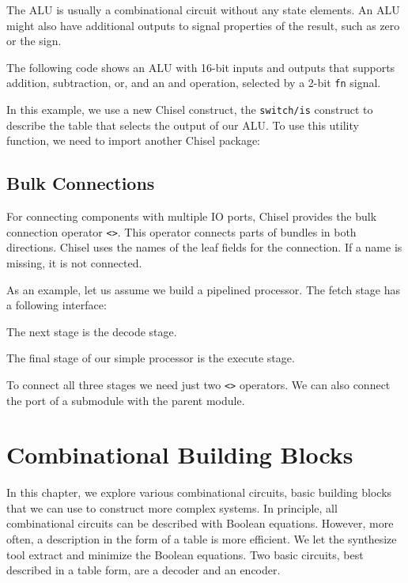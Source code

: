 \documentclass[%
    10pt,
    headinclude, footexclude,
    openright, %
    notitlepage,
    cleardoubleempty,
    headsepline,
    pointlessnumbers,
    bibtotoc, idxtotoc,
    ]{scrbook}
\newcommand{\code}[1]{{\small{\texttt{#1}}}}
\begin{document}
The ALU is usually a combinational circuit without any state elements.
An ALU might also have additional outputs to signal properties
of the result, such as zero or the sign.

The following code shows an ALU with 16-bit inputs and outputs that supports addition, subtraction, or, and an and
operation, selected by a 2-bit \code{fn} signal.


\noindent In this example, we use a new Chisel construct, the \code{switch/is} construct to describe
the table that selects the output of our ALU.
To use this utility function, we need to import another Chisel package:


\section{Bulk Connections}


For connecting components with multiple IO ports, Chisel provides the
bulk connection operator \code{<>}. This operator connects parts of bundles
in both directions. Chisel uses the names of the leaf fields for the connection.
If a name is missing, it is not connected.

As an example, let us assume we build a pipelined processor. The fetch
stage has a following interface:

\noindent The next stage is the decode stage.

\noindent The final stage of our simple processor is the execute stage.

To connect all three stages we need just two \code{<>} operators.
We can also connect the port of a submodule with the parent module.


\chapter{Combinational Building Blocks}
\label{chap:comb}

In this chapter, we explore various combinational circuits, basic building blocks that we can
use to construct more complex systems.
In principle, all combinational circuits can be described with Boolean equations.
However, more often, a description in the form of a table is more efficient.
We let the synthesize tool extract and minimize the Boolean equations.
Two basic circuits, best described in a table form, are a decoder and an encoder.
\end{document}
